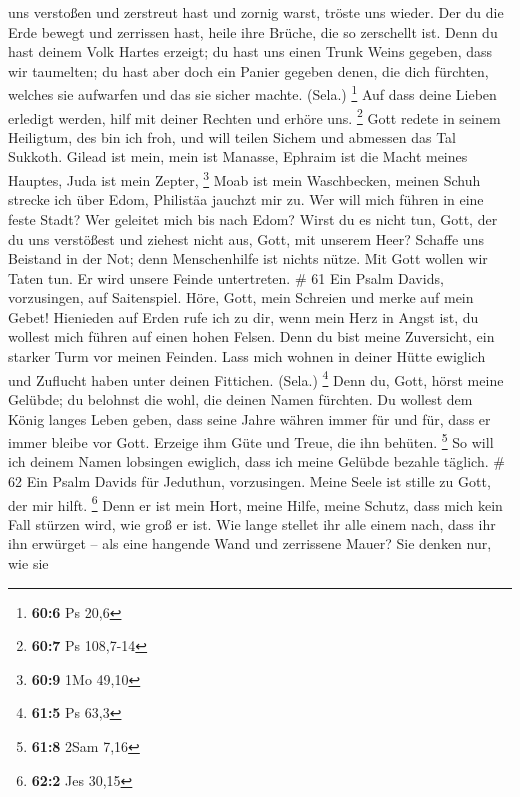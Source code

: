 uns verstoßen und zerstreut hast und zornig warst, tröste uns wieder.
 Der du die Erde bewegt und zerrissen hast, heile ihre
Brüche, die so zerschellt ist.  Denn du hast deinem Volk
Hartes erzeigt; du hast uns einen Trunk Weins gegeben, dass wir
taumelten;  du hast aber doch ein Panier gegeben denen, die
dich fürchten, welches sie aufwarfen und das sie sicher machte. (Sela.)
\footnote{\textbf{60:6} Ps 20,6}  Auf dass deine Lieben
erledigt werden, hilf mit deiner Rechten und erhöre uns. \footnote{\textbf{60:7}
  Ps 108,7-14}  Gott redete in seinem Heiligtum, des bin ich
froh, und will teilen Sichem und abmessen das Tal Sukkoth. 
Gilead ist mein, mein ist Manasse, Ephraim ist die Macht meines Hauptes,
Juda ist mein Zepter, \footnote{\textbf{60:9} 1Mo 49,10} 
Moab ist mein Waschbecken, meinen Schuh strecke ich über Edom, Philistäa
jauchzt mir zu.  Wer will mich führen in eine feste Stadt?
Wer geleitet mich bis nach Edom?  Wirst du es nicht tun,
Gott, der du uns verstößest und ziehest nicht aus, Gott, mit unserem
Heer?  Schaffe uns Beistand in der Not; denn Menschenhilfe
ist nichts nütze.  Mit Gott wollen wir Taten tun. Er wird
unsere Feinde untertreten. \# 61  Ein Psalm Davids,
vorzusingen, auf Saitenspiel.  Höre, Gott, mein Schreien und
merke auf mein Gebet!  Hienieden auf Erden rufe ich zu dir,
wenn mein Herz in Angst ist, du wollest mich führen auf einen hohen
Felsen.  Denn du bist meine Zuversicht, ein starker Turm vor
meinen Feinden.  Lass mich wohnen in deiner Hütte ewiglich
und Zuflucht haben unter deinen Fittichen. (Sela.) \footnote{\textbf{61:5}
  Ps 63,3}  Denn du, Gott, hörst meine Gelübde; du belohnst
die wohl, die deinen Namen fürchten.  Du wollest dem König
langes Leben geben, dass seine Jahre währen immer für und für,
 dass er immer bleibe vor Gott. Erzeige ihm Güte und Treue,
die ihn behüten. \footnote{\textbf{61:8} 2Sam 7,16}  So will
ich deinem Namen lobsingen ewiglich, dass ich meine Gelübde bezahle
täglich. \# 62  Ein Psalm Davids für Jeduthun, vorzusingen.
 Meine Seele ist stille zu Gott, der mir hilft. \footnote{\textbf{62:2}
  Jes 30,15}  Denn er ist mein Hort, meine Hilfe, meine
Schutz, dass mich kein Fall stürzen wird, wie groß er ist. 
Wie lange stellet ihr alle einem nach, dass ihr ihn erwürget -- als eine
hangende Wand und zerrissene Mauer?  Sie denken nur, wie sie
